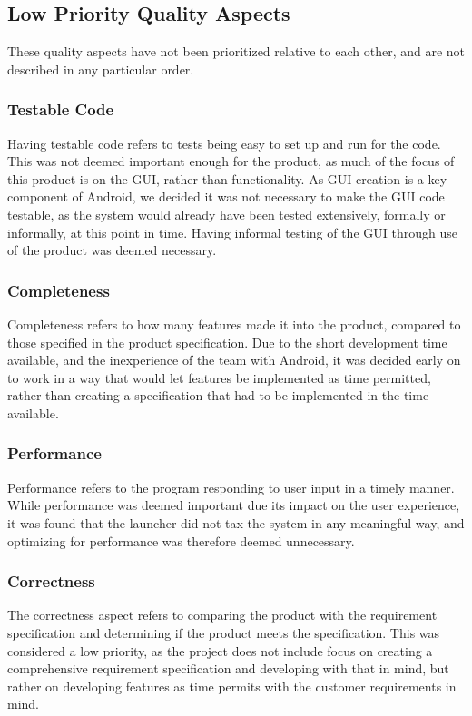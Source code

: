 \subsection{Low Priority Quality Aspects}
These quality aspects have not been prioritized relative to each other, and are not described in any particular order. 

\subsubsection{Testable Code}
Having testable code refers to tests being easy to set up and run for the code. 
This was not deemed important enough for the product, as much of the focus of this product is on the GUI, rather than functionality. 
As GUI creation is a key component of Android, we decided it was not necessary to make the GUI code testable, as the system would already have been tested extensively, formally or informally, at this point in time. 
Having informal testing of the GUI through use of the product was deemed necessary.

\subsubsection{Completeness}
Completeness refers to how many features made it into the product, compared to those specified in the product specification. 
Due to the short development time available, and the inexperience of the team with Android, it was decided early on to work in a way that would let features be implemented as time permitted, rather than creating a specification that had to be implemented in the time available.

\subsubsection{Performance}
Performance refers to the program responding to user input in a timely manner. 
While performance was deemed important due its impact on the user experience, it was found that the launcher did not tax the system in any meaningful way, and optimizing for performance was therefore deemed unnecessary.

\subsubsection{Correctness}
The correctness aspect refers to comparing the product with the requirement specification and determining if the product meets the specification. 
This was considered a low priority, as the project does not include focus on creating a comprehensive requirement specification and developing with that in mind, but rather on developing features as time permits with the customer requirements in mind.

